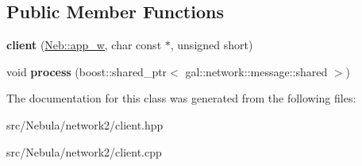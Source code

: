 \subsection*{\-Public \-Member \-Functions}
\begin{DoxyCompactItemize}
\item 
\hypertarget{classNeb_1_1network_1_1client_a84322d875326ae66e268c2c7b41d0829}{{\bfseries client} (\hyperlink{classNeb_1_1weak__ptr}{\-Neb\-::app\-\_\-w}, char const $\ast$, unsigned short)}\label{classNeb_1_1network_1_1client_a84322d875326ae66e268c2c7b41d0829}

\item 
\hypertarget{classNeb_1_1network_1_1client_a5e5bc74c7431b6d81bcd9b6a2548c94c}{void {\bfseries process} (boost\-::shared\-\_\-ptr$<$ gal\-::network\-::message\-::shared $>$)}\label{classNeb_1_1network_1_1client_a5e5bc74c7431b6d81bcd9b6a2548c94c}

\end{DoxyCompactItemize}


\-The documentation for this class was generated from the following files\-:\begin{DoxyCompactItemize}
\item 
src/\-Nebula/network2/client.\-hpp\item 
src/\-Nebula/network2/client.\-cpp\end{DoxyCompactItemize}
